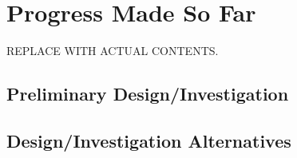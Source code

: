 \chapter{Progress Made So Far}
REPLACE WITH ACTUAL CONTENTS.

\section{Preliminary Design/Investigation}

\section{Design/Investigation Alternatives}